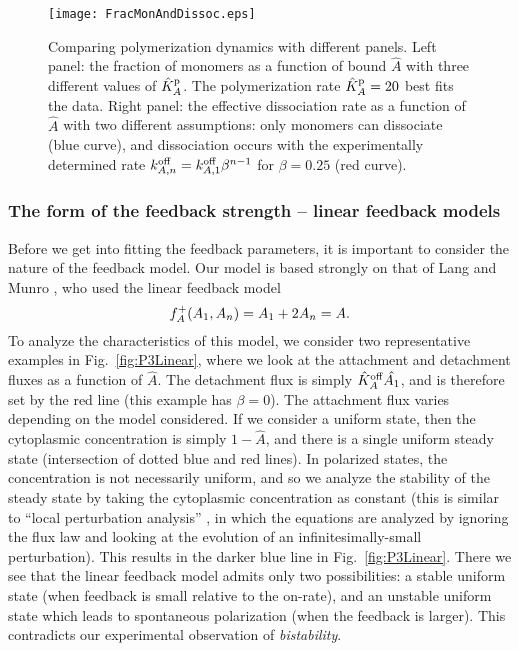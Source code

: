\documentclass[11pt]{article}
\newcommand{\6}[1]{#1_{\text{6}}}
\newcommand{\3}[1]{#1_{\text{3}}}
\begin{document}
\begin{figure}
\centering
\texttt{[image: FracMonAndDissoc.eps]}
\caption{\label{fig:FracMonDissoc}Comparing polymerization dynamics with different panels. Left panel: the fraction of monomers as a function of bound $\hat A$ with three different values of $\hat{K}^\text{p}_A$. The polymerization rate $\hat{K}^\text{p}_A=20$ best fits the data. Right panel: the effective dissociation rate as a function of $\hat A$ with two different assumptions: only monomers can dissociate (blue curve), and dissociation occurs with the experimentally determined rate $k^\text{off}_{A,n}=k^\text{off}_{A,1} \beta^{n-1}$ for $\beta=0.25$ (red curve).}
\end{figure}

\subsubsection{The form of the feedback strength -- linear feedback models}
Before we get into fitting the feedback parameters, it is important to consider the nature of the feedback model. Our model is based strongly on that of Lang and Munro \cite{lang2022oligomerization}, who used the linear feedback model $$f_A^+(A_1,A_n)=A_1+2A_n=A.$$ 
To analyze the characteristics of this model, we consider two representative examples in Fig.\ \ref{fig:P3Linear}, where we look at the attachment and detachment fluxes as a function of $\hat A$. The detachment flux is simply $\hat{K}^\text{off}_A \hat {A_1}$, and is therefore set by the red line (this example has $\beta=0$). The attachment flux varies depending on the model considered. If we consider a uniform state, then the cytoplasmic concentration is simply $1-\hat A$, and there is a single uniform steady state (intersection of dotted blue and red lines). In polarized states, the concentration is not necessarily uniform, and so we analyze the stability of the steady state by taking the cytoplasmic concentration as constant (this is similar to ``local perturbation analysis'' \cite{holmes2015local}, in which the equations are analyzed by ignoring the flux law and looking at the evolution of an infinitesimally-small perturbation). This results in the darker blue line in Fig.\ \ref{fig:P3Linear}. There we see that the linear feedback model admits only two possibilities: a stable uniform state (when feedback is small relative to the on-rate), and an unstable uniform state which leads to spontaneous polarization (when the feedback is larger). This contradicts our experimental observation of \emph{bistability}.
\end{document}
